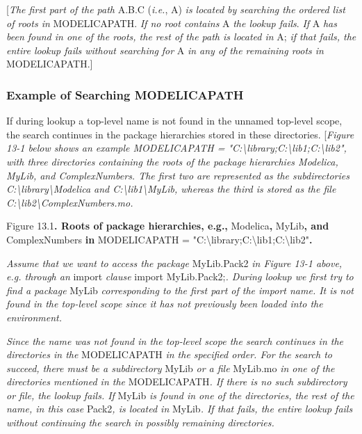 \documentclass[10pt,a4paper]{report}
\def\doublelabel#1{\label{#1}}
\begin{document}
{[}\emph{The first part of the path} A.B.C (\emph{i.e.}, A) \emph{is
located by searching the ordered list of roots in} MODELICAPATH.
\emph{If no root contains} A \emph{the lookup fails}. \emph{If} A
\emph{has been found in one of the roots, the rest of the path is
located in} A; \emph{if that fails, the entire lookup fails without
searching} \emph{for} A \emph{in any of the remaining roots in}
MODELICAPATH.{]}

\subsubsection{Example of Searching MODELICAPATH}\doublelabel{example-of-searching-modelicapath}

If during lookup a top-level name is not found in the unnamed top-level
scope, the search continues in the package hierarchies stored in these
directories. {[}\emph{Figure 13-1 below shows an example MODELICAPATH =
"C:\textbackslash{}library;C:\textbackslash{}lib1;C:\textbackslash{}lib2",
with three directories containing the roots of the package hierarchies
Modelica, MyLib, and ComplexNumbers. The first two are represented as
the subdirectories C:\textbackslash{}library\textbackslash{}Modelica and
C:\textbackslash{}lib1\textbackslash{}MyLib, whereas the third is stored
as the file C:\textbackslash{}lib2\textbackslash{}ComplexNumbers.mo.}

Figure 13.1\textbf{. Roots of package hierarchies, e.g.,}
Modelica\textbf{,} MyLib\textbf{, and} ComplexNumbers \textbf{in}
MODELICAPATH =
"C:\textbackslash{}library;C:\textbackslash{}lib1;C:\textbackslash{}lib2"\textbf{.}

\emph{Assume that we want to access the package} MyLib.Pack2 \emph{in
Figure 13-1 above, e.g. through an} import \emph{clause} import
MyLib.Pack2;\emph{. During lookup we first try to find a package} MyLib
\emph{corresponding to the first part of the import name. It is not
found in the top-level scope since it has not previously been loaded
into the environment. }

\emph{Since the name was not found in the top-level scope the search
continues in the directories in the} MODELICAPATH \emph{in the specified
order. For the search to succeed, there must be a subdirectory} MyLib
\emph{or a file} MyLib.mo \emph{in one of the directories mentioned in
the} MODELICAPATH\emph{. If there is no such subdirectory or file, the
lookup fails. If} MyLib \emph{is found in one of the directories, the
rest of the name, in this case} Pack2\emph{, is located in} MyLib\emph{.
If that fails, the entire lookup fails without continuing the search in
possibly remaining directories.}
\end{document}
